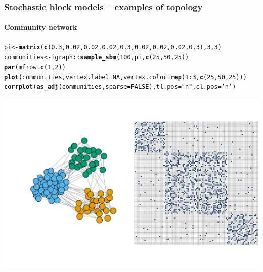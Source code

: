 \documentclass{beamer}\usepackage[]{graphicx}\usepackage[]{color}
\makeatletter
\newcommand{\hlnum}[1]{\textcolor[rgb]{0.686,0.059,0.569}{#1}}%
\newcommand{\hlstr}[1]{\textcolor[rgb]{0.192,0.494,0.8}{#1}}%
\newcommand{\hlopt}[1]{\textcolor[rgb]{0,0,0}{#1}}%
\newcommand{\hlstd}[1]{\textcolor[rgb]{0.345,0.345,0.345}{#1}}%
\newcommand{\hlkwb}[1]{\textcolor[rgb]{0.69,0.353,0.396}{#1}}%
\newcommand{\hlkwc}[1]{\textcolor[rgb]{0.333,0.667,0.333}{#1}}%
\newcommand{\hlkwd}[1]{\textcolor[rgb]{0.737,0.353,0.396}{\textbf{#1}}}%
\newenvironment{kframe}{%
 \def\at@end@of@kframe{}%
 \ifinner\ifhmode%
  \def\at@end@of@kframe{\end{minipage}}%
  \begin{minipage}{\columnwidth}%
 \fi\fi%
 \def\FrameCommand##1{\hskip\@totalleftmargin \hskip-\fboxsep
 \colorbox{shadecolor}{##1}\hskip-\fboxsep
     \hskip-\linewidth \hskip-\@totalleftmargin \hskip\columnwidth}%
 \MakeFramed {\advance\hsize-\width
   \@totalleftmargin\z@ \linewidth\hsize
   \@setminipage}}%
 {\par\unskip\endMakeFramed%
 \at@end@of@kframe}
\newenvironment{knitrout}{}{} %
\makeatother
\begin{document}
\begin{frame}[fragile]
  \frametitle{Stochastic block models -- examples of topology}
  \framesubtitle{Community network}

\begin{knitrout}\scriptsize
{}\color{fgcolor}\begin{kframe}
\begin{alltt}
\hlstd{pi} \hlkwb{<-} \hlkwd{matrix}\hlstd{(}\hlkwd{c}\hlstd{(}\hlnum{0.3}\hlstd{,}\hlnum{0.02}\hlstd{,}\hlnum{0.02}\hlstd{,}\hlnum{0.02}\hlstd{,}\hlnum{0.3}\hlstd{,}\hlnum{0.02}\hlstd{,}\hlnum{0.02}\hlstd{,}\hlnum{0.02}\hlstd{,}\hlnum{0.3}\hlstd{),}\hlnum{3}\hlstd{,}\hlnum{3}\hlstd{)}
\hlstd{communities} \hlkwb{<-} \hlstd{igraph}\hlopt{::}\hlkwd{sample_sbm}\hlstd{(}\hlnum{100}\hlstd{, pi,} \hlkwd{c}\hlstd{(}\hlnum{25}\hlstd{,} \hlnum{50}\hlstd{,} \hlnum{25}\hlstd{))}
\hlkwd{par}\hlstd{(}\hlkwc{mfrow} \hlstd{=} \hlkwd{c}\hlstd{(}\hlnum{1}\hlstd{,}\hlnum{2}\hlstd{))}
\hlkwd{plot}\hlstd{(communities,} \hlkwc{vertex.label}\hlstd{=}\hlnum{NA}\hlstd{,} \hlkwc{vertex.color} \hlstd{=} \hlkwd{rep}\hlstd{(}\hlnum{1}\hlopt{:}\hlnum{3}\hlstd{,}\hlkwd{c}\hlstd{(}\hlnum{25}\hlstd{,} \hlnum{50}\hlstd{,} \hlnum{25}\hlstd{)))}
\hlkwd{corrplot}\hlstd{(}\hlkwd{as_adj}\hlstd{(communities,} \hlkwc{sparse} \hlstd{=}\hlnum{FALSE}\hlstd{),} \hlkwc{tl.pos} \hlstd{=} \hlstr{"n"}\hlstd{,} \hlkwc{cl.pos} \hlstd{=} \hlstr{'n'}\hlstd{)}
\end{alltt}
\end{kframe}
\includegraphics[width=.8\textwidth]{figures/unnamed-chunk-8-1} 
\end{knitrout}

\end{frame}
\end{document}
